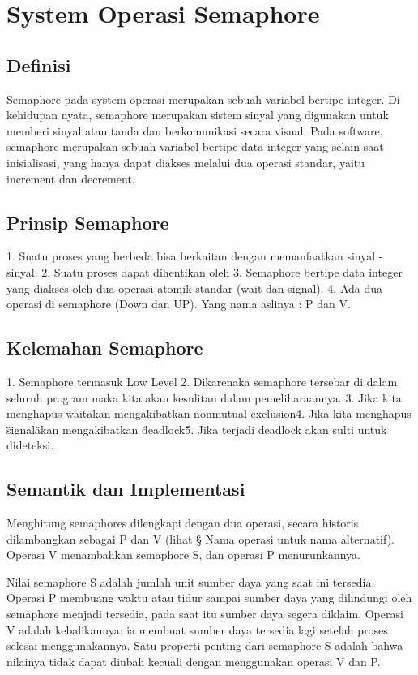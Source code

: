 \section{System Operasi Semaphore}
\subsection{Definisi}
Semaphore pada system operasi merupakan sebuah variabel bertipe integer. Di kehidupan nyata, semaphore merupakan sistem sinyal yang digunakan untuk memberi 
sinyal atau tanda dan berkomunikasi secara visual. Pada software, semaphore merupakan sebuah variabel bertipe data integer yang selain saat inisialisasi, yang hanya dapat diakses melalui dua operasi standar, yaitu increment dan decrement.
\subsection{Prinsip Semaphore}
1. Suatu proses yang berbeda bisa berkaitan dengan memanfaatkan sinyal - sinyal.
2. Suatu proses dapat dihentikan oleh 
3. Semaphore bertipe data integer yang diakses oleh dua operasi atomik standar (wait dan signal).
4. Ada dua operasi di semaphore (Down dan UP). Yang nama aslinya : P dan V.
\subsection{Kelemahan Semaphore}
1. Semaphore termasuk Low Level
2. Dikarenaka semaphore tersebar di dalam seluruh program maka kita akan kesulitan dalam pemeliharaannya.
3. Jika kita menghapus \"wait\" akan mengakibatkan \"nonmutual exclusion\"
4. Jika kita menghapus \"signal\" akan mengakibatkan \"deadlock\"
5. Jika terjadi deadlock akan sulti untuk dideteksi.
\subsection{Semantik dan Implementasi}
Menghitung semaphores dilengkapi dengan dua operasi, secara historis dilambangkan sebagai P dan V (lihat § Nama operasi untuk nama alternatif). Operasi V menambahkan
semaphore S, dan operasi P menurunkannya.

Nilai semaphore S adalah jumlah unit sumber daya yang saat ini tersedia. Operasi P membuang waktu atau tidur sampai sumber daya yang dilindungi oleh semaphore 
menjadi tersedia, pada saat itu sumber daya segera diklaim. Operasi V adalah kebalikannya: ia membuat sumber daya tersedia lagi setelah proses selesai menggunakannya.
Satu properti penting dari semaphore S adalah bahwa nilainya tidak dapat diubah kecuali dengan menggunakan operasi V dan P.

